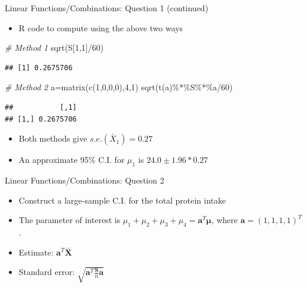 \documentclass[
  ignorenonframetext,
]{beamer}
\newenvironment{Shaded}{\begin{snugshade}}{\end{snugshade}}
\newcommand{\CommentTok}[1]{\textcolor[rgb]{0.56,0.35,0.01}{\textit{#1}}}
\newcommand{\DecValTok}[1]{\textcolor[rgb]{0.00,0.00,0.81}{#1}}
\newcommand{\FunctionTok}[1]{\textcolor[rgb]{0.00,0.00,0.00}{#1}}
\newcommand{\NormalTok}[1]{#1}
\newcommand{\OtherTok}[1]{\textcolor[rgb]{0.56,0.35,0.01}{#1}}
\newcommand{\SpecialCharTok}[1]{\textcolor[rgb]{0.00,0.00,0.00}{#1}}
\providecommand{\tightlist}{%
  \setlength{\itemsep}{0pt}\setlength{\parskip}{0pt}}
\begin{document}
\begin{frame}[fragile]{Linear Functions/Combinations: Question 1
(continued)}
\protect\hypertarget{linear-functionscombinations-question-1-continued}{}
\begin{itemize}
\tightlist
\item
  R code to compute using the above two ways
\end{itemize}

\begin{Shaded}
\begin{Highlighting}[]
\CommentTok{\# Method 1}
\FunctionTok{sqrt}\NormalTok{(S[}\DecValTok{1}\NormalTok{,}\DecValTok{1}\NormalTok{]}\SpecialCharTok{/}\DecValTok{60}\NormalTok{)}
\end{Highlighting}
\end{Shaded}

\begin{verbatim}
## [1] 0.2675706
\end{verbatim}

\begin{Shaded}
\begin{Highlighting}[]
\CommentTok{\# Method 2}
\NormalTok{a}\OtherTok{=}\FunctionTok{matrix}\NormalTok{(}\FunctionTok{c}\NormalTok{(}\DecValTok{1}\NormalTok{,}\DecValTok{0}\NormalTok{,}\DecValTok{0}\NormalTok{,}\DecValTok{0}\NormalTok{),}\DecValTok{4}\NormalTok{,}\DecValTok{1}\NormalTok{)}
\FunctionTok{sqrt}\NormalTok{(}\FunctionTok{t}\NormalTok{(a)}\SpecialCharTok{\%*\%}\NormalTok{S}\SpecialCharTok{\%*\%}\NormalTok{a}\SpecialCharTok{/}\DecValTok{60}\NormalTok{)}
\end{Highlighting}
\end{Shaded}

\begin{verbatim}
##           [,1]
## [1,] 0.2675706
\end{verbatim}

\begin{itemize}
\tightlist
\item
  Both methods give \(s.e.(\bar X_1)=0.27\)
\item
  An approximate 95\% C.I. for \(\mu_1\) is \(24.0 \pm 1.96*0.27\)
\end{itemize}
\end{frame}

\begin{frame}{Linear Functions/Combinations: Question 2}
\protect\hypertarget{linear-functionscombinations-question-2}{}
\begin{itemize}
\tightlist
\item
  Construct a large-sample C.I. for the total protein intake
\item
  The parameter of interest is
  \(\mu_1+\mu_2+\mu_3+\mu_4=\mathbf a^T \boldsymbol \mu\), where
  \(\mathbf a=(1,1,1,1)^T\).
\item
  Estimate: \(\mathbf a^T \bar{\mathbf X}\)
\item
  Standard error: \(\sqrt{\mathbf a^T\frac{\mathbf S}{n} \mathbf a}\)
\end{itemize}
\end{frame}
\end{document}
